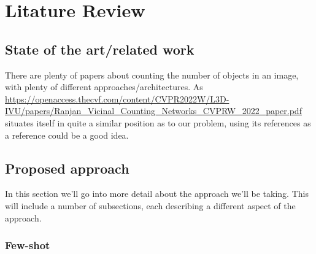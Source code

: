 
\chapter{Litature Review}

\section{State of the art/related work}
    There are plenty of papers about counting the number of objects in an image,
    with plenty of different approaches/architectures. 
    As \url{https://openaccess.thecvf.com/content/CVPR2022W/L3D-IVU/papers/Ranjan_Vicinal_Counting_Networks_CVPRW_2022_paper.pdf}
    situates itself in quite a similar position as to our problem, 
    using its references as a reference could be a good idea.
    
\section{Proposed approach}
    In this section we'll go into more detail about the approach we'll be taking.
    This will include a number of subsections, each describing a different aspect of the approach.
    \subsection{Few-shot}


